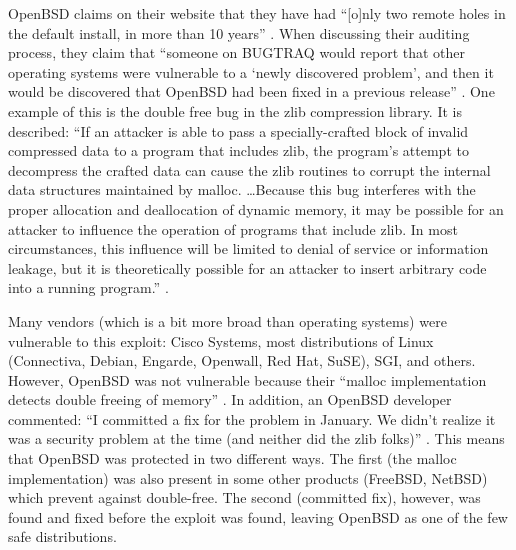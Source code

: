 \documentclass[12pt]{article}
\begin{document}
{OpenBSD claims on their website that they have had ``[o]nly two remote holes in the default install, in more than 10 years'' \cite{openbsd}. When discussing their auditing process, they claim that ``someone on BUGTRAQ would report that other operating systems were vulnerable to a `newly discovered problem', and then it would be discovered that OpenBSD had been fixed in a previous release'' \cite{openbsd-security}. One example of this is the double free bug in the zlib compression library. It is described: ``If an attacker is able to pass a specially-crafted block of invalid compressed data to a program that includes zlib, the program's attempt to decompress the crafted data can cause the zlib routines to corrupt the internal data structures maintained by malloc. \ldots Because this bug interferes with the proper allocation and deallocation of dynamic memory, it may be possible for an attacker to influence the operation of programs that include zlib. In most circumstances, this influence will be limited to denial of service or information leakage, but it is theoretically possible for an attacker to insert arbitrary code into a running program.'' \cite{zlib}.

Many vendors (which is a bit more broad than operating systems) were vulnerable to this exploit: Cisco Systems, most distributions of Linux (Connectiva, Debian, Engarde, Openwall, Red Hat, SuSE), SGI, and others. However, OpenBSD was not vulnerable because their ``malloc implementation detects double freeing of memory'' \cite{zlib}. In addition, an OpenBSD developer commented: ``I committed a fix for the problem in January. We didn't realize it was a security problem at the time (and neither did the zlib folks)'' \cite{zlib-fix}. This means that OpenBSD was protected in two different ways. The first (the malloc implementation) was also present in some other products (FreeBSD, NetBSD) which prevent against double-free. The second (committed fix), however, was found and fixed before the exploit was found, leaving OpenBSD as one of the few safe distributions.

}
\end{document}
